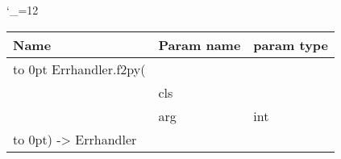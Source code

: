 \begingroup \catcode`\_=12 \tt
\begin{tabular}{lll}
\toprule
\textrm{Name}&\textrm{Param name}&\textrm{param type}\\
\midrule
\hbox to 0pt {Errhandler.f2py(\hss}\\
& cls\\
& arg & int\\
\hbox to 0pt{) -> Errhandler\hss}\\
\bottomrule
\end{tabular}
\endgroup

